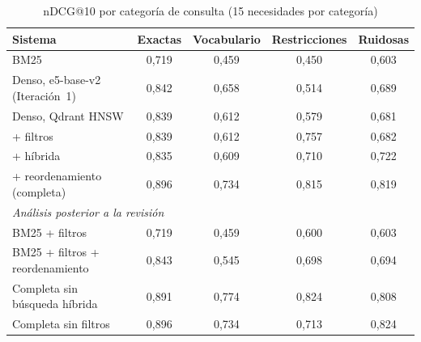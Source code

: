 \begin{table}[htbp!]
    \centering
    \caption{nDCG@10 por categoría de consulta (15 necesidades por categoría)}
    \label{tab:res-pe1-categoria}
    \small
    \begin{tabular}{|l|c|c|c|c|}
        \hline
        \textbf{Sistema} & \textbf{Exactas} & \textbf{Vocabulario} & \textbf{Restricciones} & \textbf{Ruidosas} \\
        \hline
        BM25 & 0{,}719 & 0{,}459 & 0{,}450 & 0{,}603 \\
        \hline
        Denso, e5-base-v2 (Iteración~1) & 0{,}842 & 0{,}658 & 0{,}514 & 0{,}689 \\
        \hline
        Denso, Qdrant HNSW & 0{,}839 & 0{,}612 & 0{,}579 & 0{,}681 \\
        \hline
        + filtros & 0{,}839 & 0{,}612 & 0{,}757 & 0{,}682 \\
        \hline
        + híbrida & 0{,}835 & 0{,}609 & 0{,}710 & 0{,}722 \\
        \hline
        + reordenamiento (completa) & 0{,}896 & 0{,}734 & 0{,}815 & 0{,}819 \\
        \hline
        \multicolumn{5}{|l|}{\textit{Análisis posterior a la revisión}} \\
        \hline
        BM25 + filtros & 0{,}719 & 0{,}459 & 0{,}600 & 0{,}603 \\
        \hline
        BM25 + filtros + reordenamiento & 0{,}843 & 0{,}545 & 0{,}698 & 0{,}694 \\
        \hline
        Completa sin búsqueda híbrida & 0{,}891 & 0{,}774 & 0{,}824 & 0{,}808 \\
        \hline
        Completa sin filtros & 0{,}896 & 0{,}734 & 0{,}713 & 0{,}824 \\
        \hline
    \end{tabular}
\end{table}
